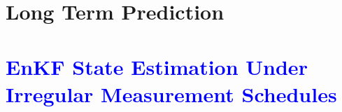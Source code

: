 \documentclass[10pt]{article}
\begin{document}
\section{Long Term Prediction}

\clearpage
\newpage
\section{\textcolor{blue}{EnKF State Estimation Under Irregular Measurement Schedules}}

\clearpage
\newpage
%
\end{document}
